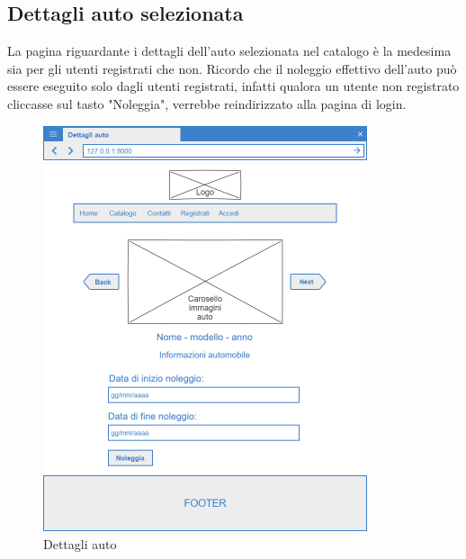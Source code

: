 \documentclass[12pt,a4paperS]{report}
\begin{document}
\begin{normalsize}
			\subsection{Dettagli auto selezionata}
				La pagina riguardante i dettagli dell'auto selezionata nel catalogo è la medesima sia per gli utenti registrati che non.
				\newline
				Ricordo che il noleggio effettivo dell'auto può essere eseguito solo dagli utenti registrati, infatti qualora un utente non registrato cliccasse sul tasto "Noleggia", verrebbe reindirizzato alla pagina di login.
				\begin{figure}[H]
					\centering
					\includegraphics[width=0.85\textwidth, height=0.85\textheight, keepaspectratio]{Mockup/Dettagli_auto.png}
					\caption{Dettagli auto}
				\end{figure}
			

\end{normalsize}
\end{document}
